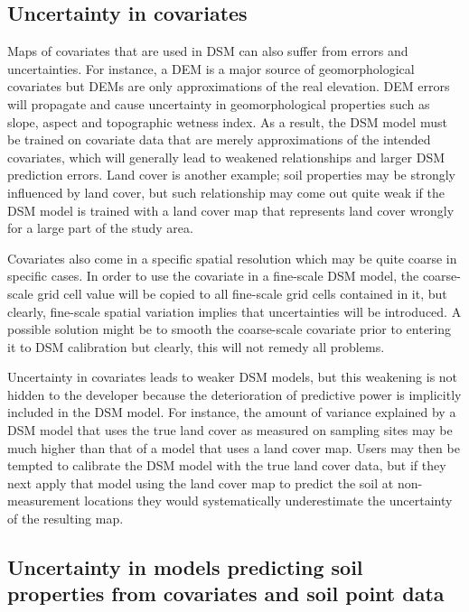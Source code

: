 \documentclass[10pt,b5paper,]{book}
\theoremstyle{definition}
\theoremstyle{definition}
\theoremstyle{definition}
\theoremstyle{remark}
\begin{document}
\hypertarget{uncertainty-in-covariates}{%
\subsection{Uncertainty in covariates}\label{uncertainty-in-covariates}}

Maps of covariates that are used in DSM can also suffer from errors and
uncertainties. For instance, a DEM is a major source of geomorphological
covariates but DEMs are only approximations of the real elevation. DEM
errors will propagate and cause uncertainty in geomorphological
properties such as slope, aspect and topographic wetness index. As a
result, the DSM model must be trained on covariate data that are merely
approximations of the intended covariates, which will generally lead to
weakened relationships and larger DSM prediction errors. Land cover is
another example; soil properties may be strongly influenced by land
cover, but such relationship may come out quite weak if the DSM model is
trained with a land cover map that represents land cover wrongly for a
large part of the study area.

Covariates also come in a specific spatial resolution which may be quite
coarse in specific cases. In order to use the covariate in a fine-scale
DSM model, the coarse-scale grid cell value will be copied to all
fine-scale grid cells contained in it, but clearly, fine-scale spatial
variation implies that uncertainties will be introduced. A possible
solution might be to smooth the coarse-scale covariate prior to entering
it to DSM calibration but clearly, this will not remedy all problems.

Uncertainty in covariates leads to weaker DSM models, but this weakening
is not hidden to the developer because the deterioration of predictive
power is implicitly included in the DSM model. For instance, the amount
of variance explained by a DSM model that uses the true land cover as
measured on sampling sites may be much higher than that of a model that
uses a land cover map. Users may then be tempted to calibrate the DSM
model with the true land cover data, but if they next apply that model
using the land cover map to predict the soil at non-measurement
locations they would systematically underestimate the uncertainty of the
resulting map.

\hypertarget{uncertainty-in-models-predicting-soil-properties-from-covariates-and-soil-point-data}{%
\subsection{Uncertainty in models predicting soil properties from
covariates and soil point
data}\label{uncertainty-in-models-predicting-soil-properties-from-covariates-and-soil-point-data}}
\end{document}

